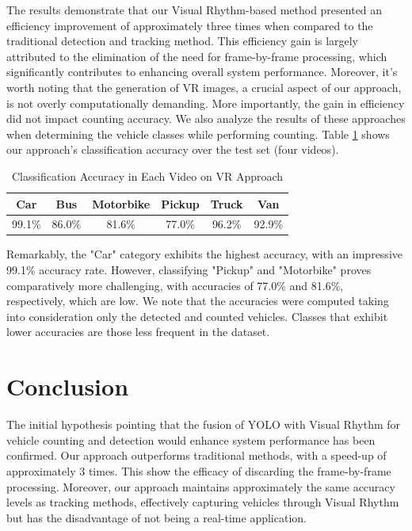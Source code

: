 \documentclass[10pt,conference]{IEEEtran}
\begin{document}
The results demonstrate that our Visual Rhythm-based method presented an efficiency improvement of approximately three times when compared to the traditional detection and tracking method. This efficiency gain is largely attributed to the elimination of the need for frame-by-frame processing, which significantly contributes to enhancing overall system performance. Moreover, it's worth noting that the generation of VR images, a crucial aspect of our approach, is not overly computationally demanding. More importantly, the gain in efficiency did not impact counting accuracy. We also analyze the results of these approaches when determining the vehicle classes while performing counting. Table \ref{tab:test2} shows our approach's classification accuracy over the test set (four videos). 

\begin{table}[htp]
\renewcommand{\arraystretch}{1.3}
    \caption{Classification Accuracy in Each Video on VR Approach}
    \label{tab:test2}
    \centering
    \begin{tabular}{|c||c||c||c||c||c|}
        \hline
        Car & Bus & Motorbike & Pickup & Truck & Van\\
        \hline
        99.1\% & 86.0\% & 81.6\% & 77.0\% & 96.2\% & 92.9\% \\
    \hline
    \end{tabular}
\end{table}

Remarkably, the "Car" category exhibits the highest accuracy, with an impressive 99.1\% accuracy rate. However, classifying "Pickup" and "Motorbike" proves comparatively more challenging, with accuracies of 77.0\% and 81.6\%, respectively, which are low. 
We note that the accuracies were computed taking into consideration only the detected and counted vehicles. Classes that exhibit lower accuracies are those less frequent in the dataset.


\section{Conclusion}
The initial hypothesis pointing that the fusion of YOLO with Visual Rhythm for vehicle counting and detection would enhance system performance has been confirmed. Our approach outperforms traditional methods, with a speed-up of approximately 3 times. This show the efficacy of discarding the frame-by-frame processing. Moreover, our approach maintains approximately the same accuracy levels as tracking methods, effectively capturing vehicles through Visual Rhythm but has the disadvantage of not being a real-time application. 
\end{document}
